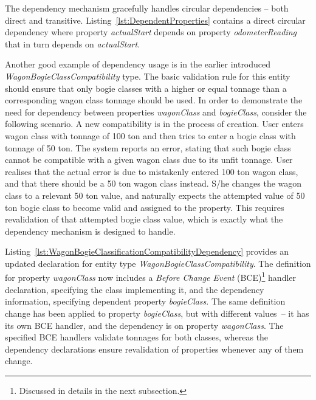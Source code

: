   The dependency mechanism gracefully handles circular dependencies -- both direct and transitive.
  Listing~\ref{lst:DependentProperties} contains a direct circular dependency where property \emph{actualStart} depends on property \emph{odometerReading} that in turn depends on \emph{actualStart}.

  Another good example of dependency usage is in the earlier introduced \emph{WagonBogieClassCompatibility} type.
  The basic validation rule for this entity should ensure that only bogie classes with a higher or equal tonnage than a corresponding wagon class tonnage should be used.
  In order to demonstrate the need for dependency between properties \emph{wagonClass} and \emph{bogieClass}, consider the following scenario.
  A new compatibility is in the process of creation.
  User enters wagon class with tonnage of 100 ton and then tries to enter a bogie class with tonnage of 50 ton.
  The system reports an error, stating that such bogie class cannot be compatible with a given wagon class due to its unfit tonnage.
  User realises that the actual error is due to mistakenly entered 100 ton wagon class, and that there should be a 50 ton wagon class instead.
  S/he changes the wagon class to a relevant 50 ton value, and naturally expects the attempted value of 50 ton bogie class to become valid and assigned to the property.
  This requires revalidation of that attempted bogie class value, which is exactly what the dependency mechanism is designed to handle.
  
  Listing~\ref{lst:WagonBogieClassificationCompatibilityDependency} provides an updated declaration for entity type \emph{WagonBogieClassCompatibility}.
  The definition for property \emph{wagonClass} now includes a \emph{Before Change Event} (BCE)\footnote{Discussed in details in the next subsection.} handler declaration, specifying the class implementing it, and the dependency information, specifying dependent property \emph{bogieClass}.
  The same definition change has been applied to property \emph{bogieClass}, but with different values~-- it has its own BCE handler, and the dependency is on property \emph{wagonClass}.
  The specified BCE handlers validate tonnages for both classes, whereas the dependency declarations ensure revalidation of properties whenever any of them change.
  
